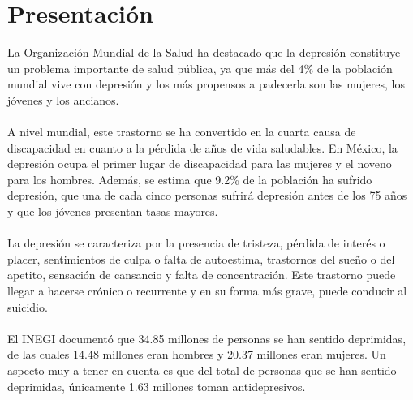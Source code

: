 \section{Presentación}
La Organización Mundial de la Salud ha destacado que la depresión constituye un problema importante de salud pública, ya que más del 4\% de la población mundial vive con depresión y los más propensos a padecerla son las mujeres, los jóvenes y los ancianos.\\\\
A nivel mundial, este trastorno se ha convertido en la cuarta causa de discapacidad en cuanto a la pérdida de años de vida saludables. En México, la depresión ocupa el primer lugar de discapacidad para las mujeres y el noveno para los hombres. Además, se estima que 9.2\% de la población ha sufrido depresión, que una de cada cinco personas sufrirá depresión antes de los 75 años y que los jóvenes presentan tasas mayores.\\\\
La depresión se caracteriza por la presencia de tristeza, pérdida de interés o placer, sentimientos de culpa o falta de autoestima, trastornos del sueño o del apetito, sensación de cansancio y falta de concentración. Este trastorno puede llegar a hacerse crónico o recurrente y en su forma más grave, puede conducir al suicidio.\\\\
El INEGI documentó que 34.85 millones de personas se han sentido deprimidas, de las cuales 14.48 millones eran hombres y 20.37 millones eran mujeres. Un aspecto muy a tener en cuenta es que del total de personas que se han sentido deprimidas, únicamente 1.63 millones toman antidepresivos. \cite{descifremos}\\\\ 
